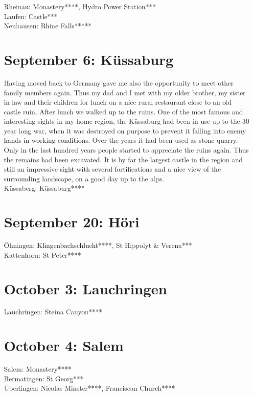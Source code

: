 Rheinau: Monastery****, Hydro Power Station***\\
Laufen: Castle***\\
Neuhausen: Rhine Falls*****

\section{September 6: K\"ussaburg}
\label{2020:Kuessaburg}

Having moved back to Germany gave me also the opportunity to meet other family members again. Thus my dad and I met with my older brother, my sister in law and their children for lunch on a nice rural restaurant close to an old castle ruin. After lunch we walked up to the ruins. One of the most famous and interesting sights in my home region, the K\"ussaburg had been in use up to the 30 year long war, when it was destroyed on purpose to prevent it falling into enemy hands in working conditions. Over the years it had been used as stone quarry. Only in the last hundred years people started to appreciate the ruins again. Thus the remains had been excavated. It is by far the largest castle in the region and still an impressive sight with several fortifications and a nice view of the surrounding landscape, on a good day up to the alps.\\

K\"ussaberg: K\"ussaburg****

\section{September 20: H\"ori}
\label{2020:Hoeri}

\"Ohningen: Klingenbachschlucht****, St Hippolyt \& Verena***\\
Kattenhorn: St Peter****

\section{October 3: Lauchringen}
\label{2020:Lauchringen}

Lauchringen: Steina Canyon****

\section{October 4: Salem}
\label{2020:Salem}

Salem: Monastery****\\
Bermatingen: St Georg***\\
\"Uberlingen: Nicolas Minster****, Franciscan Church****


